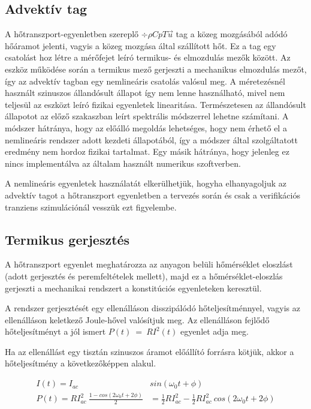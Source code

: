 \subsection{Advektív tag}\label{advection}

A hőtranszport-egyenletben szereplő $\div\rho Cp T \vec{u}$ tag a közeg mozgásából adódó hőáramot jelenti, vagyis a közeg mozgása által szállított hőt. Ez a tag egy csatolást hoz létre a mérőfejet leíró termikus- és elmozdulás mezők között. Az eszköz működése során a termikus mező gerjeszti a mechanikus elmozdulás mezőt, így az advektív tagban egy nemlineáris csatolás valósul meg. A méretezésnél használt szinuszos állandósult állapot így nem lenne használható, mivel nem teljesül az eszközt leíró fizikai egyenletek linearitása. Természetesen az állandósult állapotot az előző szakaszban leírt spektrális módszerrel lehetne számítani. A módszer hátránya, hogy az előálló megoldás lehetséges, hogy nem érhető el a nemlineáris rendszer adott kezdeti állapotából, így a módszer által szolgáltatott eredmény nem hordoz fizikai tartalmat. Egy másik hátránya, hogy jelenleg ez nincs implementálva az általam használt numerikus szoftverben.

A nemlineáris egyenletek használatát elkerülhetjük, hogyha elhanyagoljuk az advektív tagot a hőtranszport egyenletben a tervezés során és csak a verifikációs tranziens szimulációnál vesszük ezt figyelembe.

\subsection{Termikus gerjesztés}\label{heating}

A hőtranszport egyenlet meghatározza az anyagon belüli hőmérséklet eloszlást (adott gerjesztés és peremfeltételek mellett), majd ez a hőmérséklet-eloszlás gerjeszti a mechanikai rendszert a konstitúciós egyenleteken keresztül.

A rendszer gerjesztését egy ellenálláson disszipálódó hőteljesítménnyel, vagyis az ellenálláson keletkező Joule-hővel valósítjuk meg. Az ellenálláson fejlődő hőteljesítményt a jól ismert $P(t)\ =\ R I^2(t)$ egyenlet adja meg.

Ha az ellenállást egy tisztán szinuszos áramot előállító forrásra kötjük, akkor a hőteljesítmény a következőképpen alakul.

\begin{equation}
    \begin{split}
        I(t) = I_{ac}\ &sin(\omega_0t+\phi)\\
        P(t) = RI_{ac}^2\ \frac{1-cos(2\omega_0t+2\phi)}{2} &= \frac{1}{2}RI_{ac}^2-\frac{1}{2}RI_{ac}^2\ cos(2\omega_0t+2\phi)
    \end{split}
\end{equation}

